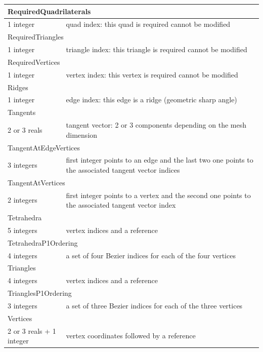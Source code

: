 \documentclass[a4paper,12pt]{article}
\begin{document}
\begin{longtable}{|m{4cm}|m{11cm}|}
\multicolumn{2}{|l|}{RequiredQuadrilaterals} \\
\hline
1 integer & quad index: this quad is required cannot be modified \\
\hline\hline

\multicolumn{2}{|l|}{RequiredTriangles} \\
\hline
1 integer & triangle index: this triangle is required cannot be modified \\
\hline\hline

\multicolumn{2}{|l|}{RequiredVertices} \\
\hline
1 integer & vertex index: this vertex is required cannot be modified \\
\hline\hline

\multicolumn{2}{|l|}{Ridges} \\
\hline
1 integer & edge index: this edge is a ridge (geometric sharp angle) \\
\hline\hline

\multicolumn{2}{|l|}{Tangents} \\
\hline
2 or 3 reals & tangent vector: 2 or 3 components depending on the mesh dimension \\
\hline\hline

\multicolumn{2}{|l|}{TangentAtEdgeVertices} \\
\hline
3 integers & first integer points to an edge and the last two one points to the associated tangent vector indices \\
\hline\hline

\multicolumn{2}{|l|}{TangentAtVertices} \\
\hline
2 integers & first integer points to a vertex and the second one points to the associated tangent vector index \\
\hline\hline

\multicolumn{2}{|l|}{Tetrahedra} \\
\hline
5 integers & vertex indices and a reference \\
\hline\hline

\multicolumn{2}{|l|}{TetrahedraP1Ordering} \\
\hline
4 integers & a set of four Bezier indices for each of the four vertices \\
\hline\hline

\multicolumn{2}{|l|}{Triangles} \\
\hline
4 integers & vertex indices and a reference \\
\hline\hline

\multicolumn{2}{|l|}{TrianglesP1Ordering} \\
\hline
3 integers & a set of three Bezier indices for each of the three vertices \\
\hline\hline

\multicolumn{2}{|l|}{Vertices} \\
\hline
2 or 3 reals + 1 integer & vertex coordinates followed by a reference \\
\hline

\end{longtable}
\end{document}
